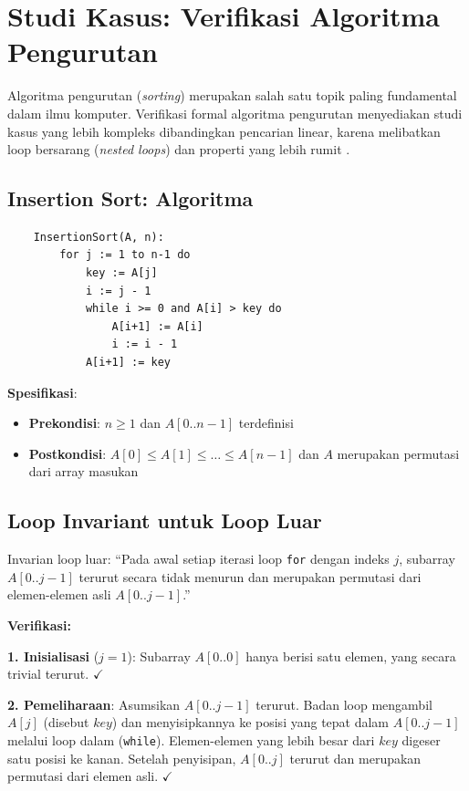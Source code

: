 \section{Studi Kasus: Verifikasi Algoritma Pengurutan}

Algoritma pengurutan (\textit{sorting}) merupakan salah satu topik paling fundamental dalam ilmu komputer. Verifikasi formal algoritma pengurutan menyediakan studi kasus yang lebih kompleks dibandingkan pencarian linear, karena melibatkan loop bersarang (\textit{nested loops}) dan properti yang lebih rumit \cite{rosen2019}.

\subsection{Insertion Sort: Algoritma}

\begin{verbatim}
    InsertionSort(A, n):
        for j := 1 to n-1 do
            key := A[j]
            i := j - 1
            while i >= 0 and A[i] > key do
                A[i+1] := A[i]
                i := i - 1
            A[i+1] := key
\end{verbatim}

\textbf{Spesifikasi}:
\begin{itemize}
    \item \textbf{Prekondisi}: $n \geq 1$ dan $A[0..n-1]$ terdefinisi
    \item \textbf{Postkondisi}: $A[0] \leq A[1] \leq \ldots \leq A[n-1]$ dan $A$ merupakan permutasi dari array masukan
\end{itemize}

\subsection{Loop Invariant untuk Loop Luar}

\begin{definisi}
Invarian loop luar: ``Pada awal setiap iterasi loop \texttt{for} dengan indeks $j$, subarray $A[0..j-1]$ terurut secara tidak menurun dan merupakan permutasi dari elemen-elemen asli $A[0..j-1]$.''
\end{definisi}

\textbf{Verifikasi:}

\textbf{1. Inisialisasi} ($j = 1$): Subarray $A[0..0]$ hanya berisi satu elemen, yang secara trivial terurut. $\checkmark$

\textbf{2. Pemeliharaan}: Asumsikan $A[0..j-1]$ terurut. Badan loop mengambil $A[j]$ (disebut $key$) dan menyisipkannya ke posisi yang tepat dalam $A[0..j-1]$ melalui loop dalam (\texttt{while}). Elemen-elemen yang lebih besar dari $key$ digeser satu posisi ke kanan. Setelah penyisipan, $A[0..j]$ terurut dan merupakan permutasi dari elemen asli. $\checkmark$

